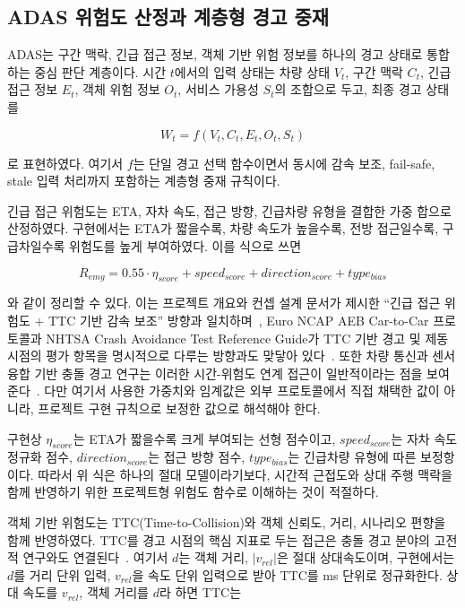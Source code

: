 \documentclass[10pt,a4paper,twocolumn]{article}
\begin{document}
\subsection{ADAS 위험도 산정과 계층형 경고 중재}

ADAS는 구간 맥락, 긴급 접근 정보, 객체 기반 위험 정보를 하나의 경고 상태로 통합하는 중심 판단 계층이다. 시간 $t$에서의 입력 상태는 차량 상태 $V_t$, 구간 맥락 $C_t$, 긴급 접근 정보 $E_t$, 객체 위험 정보 $O_t$, 서비스 가용성 $S_t$의 조합으로 두고, 최종 경고 상태를

\[
W_t=f(V_t,C_t,E_t,O_t,S_t)
\]

로 표현하였다. 여기서 $f$는 단일 경고 선택 함수이면서 동시에 감속 보조, fail-safe, stale 입력 처리까지 포함하는 계층형 중재 규칙이다.

긴급 접근 위험도는 ETA, 자차 속도, 접근 방향, 긴급차량 유형을 결합한 가중 합으로 산정하였다. 구현에서는 ETA가 짧을수록, 차량 속도가 높을수록, 전방 접근일수록, 구급차일수록 위험도를 높게 부여하였다. 이를 식으로 쓰면

\[
R_{emg}=0.55\cdot \eta_{score}+speed_{score}+direction_{score}+type_{bias}
\]

와 같이 정리할 수 있다. 이는 프로젝트 개요와 컨셉 설계 문서가 제시한 ``긴급 접근 위험도 + TTC 기반 감속 보조'' 방향과 일치하며~\cite{proj_overview,concept_design}, Euro NCAP AEB Car-to-Car 프로토콜과 NHTSA Crash Avoidance Test Reference Guide가 TTC 기반 경고 및 제동 시점의 평가 항목을 명시적으로 다루는 방향과도 맞닿아 있다~\cite{euroncap_aeb,nhtsa_crash_avoidance}. 또한 차량 통신과 센서 융합 기반 충돌 경고 연구는 이러한 시간-위험도 연계 접근이 일반적이라는 점을 보여준다~\cite{sensors_v2x_collision}. 다만 여기서 사용한 가중치와 임계값은 외부 프로토콜에서 직접 채택한 값이 아니라, 프로젝트 구현 규칙으로 보정한 값으로 해석해야 한다.

구현상 $\eta_{score}$는 ETA가 짧을수록 크게 부여되는 선형 점수이고, $speed_{score}$는 자차 속도 정규화 점수, $direction_{score}$는 접근 방향 점수, $type_{bias}$는 긴급차량 유형에 따른 보정항이다. 따라서 위 식은 하나의 절대 모델이라기보다, 시간적 근접도와 상대 주행 맥락을 함께 반영하기 위한 프로젝트형 위험도 함수로 이해하는 것이 적절하다.

객체 기반 위험도는 TTC(Time-to-Collision)와 객체 신뢰도, 거리, 시나리오 편향을 함께 반영하였다. TTC를 경고 시점의 핵심 지표로 두는 접근은 충돌 경고 분야의 고전적 연구와도 연결된다~\cite{kiefer_ttc}. 여기서 $d$는 객체 거리, $|v_{rel}|$은 절대 상대속도이며, 구현에서는 $d$를 거리 단위 입력, $v_{rel}$을 속도 단위 입력으로 받아 TTC를 ms 단위로 정규화한다. 상대 속도를 $v_{rel}$, 객체 거리를 $d$라 하면 TTC는
\end{document}
